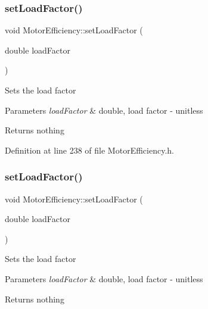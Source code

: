 \subsubsection{\texorpdfstring{set\+Load\+Factor()}{setLoadFactor()}\hspace{0.1cm}{\footnotesize\ttfamily [1/3]}}
{\footnotesize\ttfamily void Motor\+Efficiency\+::set\+Load\+Factor (\begin{DoxyParamCaption}\item[{double}]{load\+Factor }\end{DoxyParamCaption})\hspace{0.3cm}{\ttfamily [inline]}}

Sets the load factor


\begin{DoxyParams}{Parameters}
{\em load\+Factor} & double, load factor -\/ unitless\\
\hline
\end{DoxyParams}
\begin{DoxyReturn}{Returns}
nothing 
\end{DoxyReturn}


Definition at line 238 of file Motor\+Efficiency.\+h.

\mbox{\label{class_motor_efficiency_ad6a7b0eb436378f36ceb8a0cec121786}} 
\subsubsection{\texorpdfstring{set\+Load\+Factor()}{setLoadFactor()}\hspace{0.1cm}{\footnotesize\ttfamily [2/3]}}
{\footnotesize\ttfamily void Motor\+Efficiency\+::set\+Load\+Factor (\begin{DoxyParamCaption}\item[{double}]{load\+Factor }\end{DoxyParamCaption})\hspace{0.3cm}{\ttfamily [inline]}}

Sets the load factor


\begin{DoxyParams}{Parameters}
{\em load\+Factor} & double, load factor -\/ unitless\\
\hline
\end{DoxyParams}
\begin{DoxyReturn}{Returns}
nothing 
\end{DoxyReturn}


